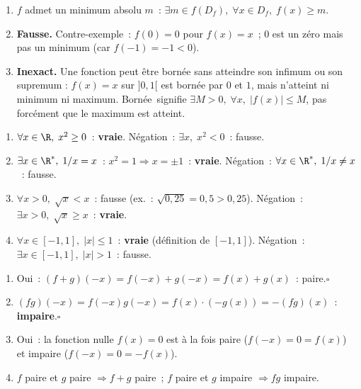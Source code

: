 
\begin{enumerate}
  \item \og $f$ admet un minimum absolu $m$\fg~:
        $\exists m\in f(D_f),\;\forall x\in D_f,\;f(x)\geq m$.
  \item \textbf{Fausse.} Contre-exemple~: $f(0)=0$ pour $f(x)=x$~;
        $0$ est un z\'ero mais pas un minimum (car $f(-1)=-1<0$).
  \item \textbf{Inexact.} Une fonction peut \^etre born\'ee sans atteindre son infimum ou
        son supremum : $f(x)=x$ sur $]0,1[$ est born\'ee par $0$ et $1$,
        mais n'atteint ni minimum ni maximum. \og Born\'ee\fg\ signifie $\exists M>0,\;\forall x,\;|f(x)|\leq M$,
        pas forc\'ement que le maximum est atteint.
\end{enumerate}


\begin{enumerate}
  \item $\forall x\in\R,\;x^2\geq0$~: \textbf{vraie}. N\'egation~: $\exists x,\;x^2<0$~: fausse.
  \item $\exists x\in\R^*,\;1/x=x$~: $x^2=1\Rightarrow x=\pm1$~: \textbf{vraie}.
        N\'egation~: $\forall x\in\R^*,\;1/x\ne x$~: fausse.
  \item $\forall x>0,\;\sqrt{x}<x$~: fausse (ex.~: $\sqrt{0{,}25}=0{,}5>0{,}25$).
        N\'egation~: $\exists x>0,\;\sqrt{x}\geq x$~: \textbf{vraie}.
  \item $\forall x\in[-1,1],\;|x|\leq1$~: \textbf{vraie} (d\'efinition de $[-1,1]$).
        N\'egation~: $\exists x\in[-1,1],\;|x|>1$~: fausse.
\end{enumerate}


\begin{enumerate}
  \item Oui~: $(f+g)(-x)=f(-x)+g(-x)=f(x)+g(x)$~: paire.\hfill$\square$
  \item $(fg)(-x)=f(-x)g(-x)=f(x)\cdot(-g(x))=-(fg)(x)$~: \textbf{impaire}.\hfill$\square$
  \item Oui~: la fonction nulle $f(x)=0$ est \`a la fois paire ($f(-x)=0=f(x)$)
        et impaire ($f(-x)=0=-f(x)$).
  \item \og $f$ paire et $g$ paire $\Rightarrow f+g$ paire\fg~; \og $f$ paire et $g$ impaire $\Rightarrow fg$ impaire\fg.
\end{enumerate}

